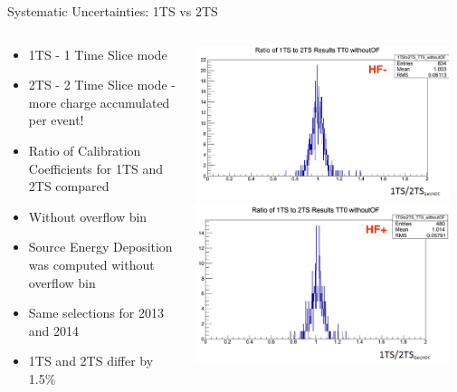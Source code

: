 \documentclass[pdf, 9pt]{beamer}
\begin{document}
  \begin{frame}{Systematic Uncertainties: 1TS vs 2TS}
    \begin{columns}[T]
      \begin{column}{0.6\textwidth}
        \begin{center}
        \begin{itemize}
            \item 1TS - 1 Time Slice mode
            \item 2TS - 2 Time Slice mode - \alert{more charge accumulated per event!}
            \item Ratio of Calibration Coefficients for 1TS and 2TS compared
            \item Without overflow bin
            \item Source Energy Deposition was computed without overflow bin
            \item Same selections for 2013 and 2014
            \item 1TS and 2TS differ by 1.5\%
        \end{itemize}
        \end{center}
      \end{column}
      \begin{column}{0.4\textwidth}
        \includegraphics[width=0.95\textwidth, height=0.4\textheight]{figs/sourcing/HFM_1TSto2TS_woOF.png}\\
        \includegraphics[width=0.95\textwidth, height=0.4\textheight]{figs/sourcing/HFP_1TSto2TS_woOF.png}
      \end{column}
    \end{columns}
  \end{frame}
\end{document}
